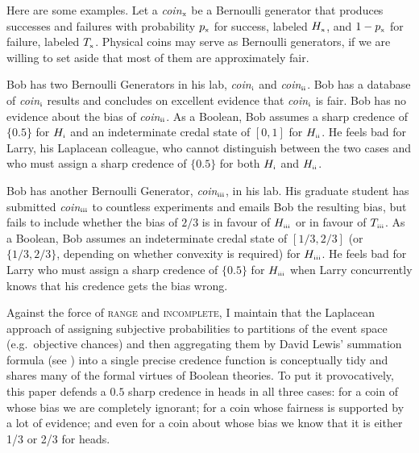 \documentclass[11pt]{article}
\begin{document}
Here are some examples. Let a \textit{coin}$_{\mbox{\tiny{x}}}$ be a
Bernoulli generator that produces successes and failures with
probability $p_{\mbox{\tiny{x}}}$ for success, labeled
$H_{\mbox{\tiny{x}}}$, and $1-p_{\mbox{\tiny{x}}}$ for failure,
labeled $T_{\mbox{\tiny{x}}}$. Physical coins may serve as Bernoulli
generators, if we are willing to set aside that most of them are
approximately fair.

\begin{quotex}
  \label{ex:range} Bob has two Bernoulli Generators in
  his lab, \textit{coin}$_{\mbox{\tiny{i}}}$ and
  \textit{coin}$_{\mbox{\tiny{ii}}}$. Bob has a database of
  \textit{coin}$_{\mbox{\tiny{i}}}$ results and concludes on excellent
  evidence that \textit{coin}$_{\mbox{\tiny{i}}}$ is fair. Bob has no
  evidence about the bias of \textit{coin}$_{\mbox{\tiny{ii}}}$. As a
  Boolean, Bob assumes a sharp credence of $\{0.5\}$ for
  $H_{\mbox{\tiny{i}}}$ and an indeterminate credal state of $[0,1]$
  for $H_{\mbox{\tiny{ii}}}$. He feels bad for Larry, his Laplacean
  colleague, who cannot distinguish between the two cases and who must
  assign a sharp credence of $\{0.5\}$ for both $H_{\mbox{\tiny{i}}}$
  and $H_{\mbox{\tiny{ii}}}$.
\end{quotex}

\begin{quotex}
  \label{ex:incomp} Bob has another Bernoulli
  Generator, \textit{coin}$_{\mbox{\tiny{iii}}}$, in his lab. His
  graduate student has submitted \textit{coin}$_{\mbox{\tiny{iii}}}$
  to countless experiments and emails Bob the resulting bias, but
  fails to include whether the bias of $2/3$ is in favour of
  $H_{\mbox{\tiny{iii}}}$ or in favour of $T_{\mbox{\tiny{iii}}}$. As
  a Boolean, Bob assumes an indeterminate credal state of $[1/3,2/3]$
  (or $\{1/3,2/3\}$, depending on whether convexity is required) for
  $H_{\mbox{\tiny{iii}}}$. He feels bad for Larry who must assign a
  sharp credence of $\{0.5\}$ for $H_{\mbox{\tiny{iii}}}$ when Larry
  concurrently knows that his credence gets the bias wrong.
\end{quotex}

Against the force of \textsc{range} and \textsc{incomplete}, I
maintain that the Laplacean approach of assigning subjective
probabilities to partitions of the event space (e.g.\ objective
chances) and then aggregating them by David Lewis' summation formula
(see ) into a single precise credence function
is conceptually tidy and shares many of the formal virtues of Boolean
theories. To put it provocatively, this paper defends a $0.5$ sharp
credence in heads in all three cases: for a coin of whose bias we are
completely ignorant; for a coin whose fairness is supported by a lot
of evidence; and even for a coin about whose bias we know that it is
either 1/3 or 2/3 for heads.
\end{document}
